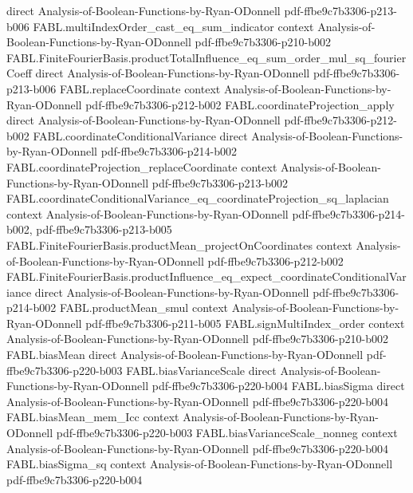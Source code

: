 \begin{theorem}
  {direct}
  {Analysis-of-Boolean-Functions-by-Ryan-ODonnell}
  {pdf-ffbe9c7b3306-p213-b006}
\proofstep
  {FABL.multiIndexOrder_cast_eq_sum_indicator}
  {context}
  {Analysis-of-Boolean-Functions-by-Ryan-ODonnell}
  {pdf-ffbe9c7b3306-p210-b002}
\proofstep
  {FABL.FiniteFourierBasis.productTotalInfluence_eq_sum_order_mul_sq_fourierCoeff}
  {direct}
  {Analysis-of-Boolean-Functions-by-Ryan-ODonnell}
  {pdf-ffbe9c7b3306-p213-b006}
\proofstep
  {FABL.replaceCoordinate}
  {context}
  {Analysis-of-Boolean-Functions-by-Ryan-ODonnell}
  {pdf-ffbe9c7b3306-p212-b002}
\proofstep
  {FABL.coordinateProjection_apply}
  {direct}
  {Analysis-of-Boolean-Functions-by-Ryan-ODonnell}
  {pdf-ffbe9c7b3306-p212-b002}
\proofstep
  {FABL.coordinateConditionalVariance}
  {direct}
  {Analysis-of-Boolean-Functions-by-Ryan-ODonnell}
  {pdf-ffbe9c7b3306-p214-b002}
\proofstep
  {FABL.coordinateProjection_replaceCoordinate}
  {context}
  {Analysis-of-Boolean-Functions-by-Ryan-ODonnell}
  {pdf-ffbe9c7b3306-p213-b002}
\proofstep
  {FABL.coordinateConditionalVariance_eq_coordinateProjection_sq_laplacian}
  {context}
  {Analysis-of-Boolean-Functions-by-Ryan-ODonnell}
  {pdf-ffbe9c7b3306-p214-b002,
    pdf-ffbe9c7b3306-p213-b005}
\proofstep
  {FABL.FiniteFourierBasis.productMean_projectOnCoordinates}
  {context}
  {Analysis-of-Boolean-Functions-by-Ryan-ODonnell}
  {pdf-ffbe9c7b3306-p212-b002}
\proofstep
  {FABL.FiniteFourierBasis.productInfluence_eq_expect_coordinateConditionalVariance}
  {direct}
  {Analysis-of-Boolean-Functions-by-Ryan-ODonnell}
  {pdf-ffbe9c7b3306-p214-b002}
\proofstep
  {FABL.productMean_smul}
  {context}
  {Analysis-of-Boolean-Functions-by-Ryan-ODonnell}
  {pdf-ffbe9c7b3306-p211-b005}
\proofstep
  {FABL.signMultiIndex_order}
  {context}
  {Analysis-of-Boolean-Functions-by-Ryan-ODonnell}
  {pdf-ffbe9c7b3306-p210-b002}
\proofstep
  {FABL.biasMean}
  {direct}
  {Analysis-of-Boolean-Functions-by-Ryan-ODonnell}
  {pdf-ffbe9c7b3306-p220-b003}
\proofstep
  {FABL.biasVarianceScale}
  {direct}
  {Analysis-of-Boolean-Functions-by-Ryan-ODonnell}
  {pdf-ffbe9c7b3306-p220-b004}
\proofstep
  {FABL.biasSigma}
  {direct}
  {Analysis-of-Boolean-Functions-by-Ryan-ODonnell}
  {pdf-ffbe9c7b3306-p220-b004}
\proofstep
  {FABL.biasMean_mem_Icc}
  {context}
  {Analysis-of-Boolean-Functions-by-Ryan-ODonnell}
  {pdf-ffbe9c7b3306-p220-b003}
\proofstep
  {FABL.biasVarianceScale_nonneg}
  {context}
  {Analysis-of-Boolean-Functions-by-Ryan-ODonnell}
  {pdf-ffbe9c7b3306-p220-b004}
\proofstep
  {FABL.biasSigma_sq}
  {context}
  {Analysis-of-Boolean-Functions-by-Ryan-ODonnell}
  {pdf-ffbe9c7b3306-p220-b004}

\end{theorem}

